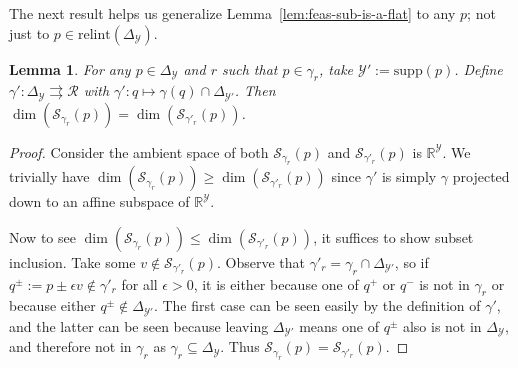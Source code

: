 \documentclass{article}
\newcommand{\Comments}{1}
\newcommand{\mytodo}[2]{\ifnum\Comments=1%
	\todo[linecolor=#1!80!black,backgroundcolor=#1,bordercolor=#1!80!black]{#2}\fi}
\newcommand{\jessiet}[1]{\mytodo{purple!20!white}{JF: #1}}
\newcommand{\reals}{\mathbb{R}}
\newcommand{\simplex}{\Delta_\Y}
\newcommand{\relint}[1]{\mathrm{relint}(#1)}
\newcommand{\supp}{\mathrm{supp}}
\newcommand{\spn}{\mathrm{span}}
\newcommand{\R}{\mathcal{R}}
\renewcommand{\S}{\mathcal{S}}
\newcommand{\Y}{\mathcal{Y}}
\newcommand{\toto}{\rightrightarrows}
\newtheorem{lemma}{Lemma}
\begin{document}
The next result helps us generalize Lemma~\ref{lem:feas-sub-is-a-flat} to any $p$; not just to $p \in \relint{\simplex}$.
\newcommand{\simplexp}{\Delta_{\Y'}}
\begin{lemma}\label{lem:p-boundary-fsd}
	For any $p \in \simplex$ and $r$ such that $p \in \gamma_r$, take $\Y' := \supp(p)$.
	Define $\gamma' : \simplex \toto \R$ with $\gamma' : q \mapsto \gamma(q) \cap \simplexp$.
	Then $\dim(\S_{\gamma_r}(p)) = \dim(\S_{\gamma'_r}(p))$.
\end{lemma}
\begin{proof}
	Consider the ambient space of both $\S_{\gamma_r}(p)$ and $\S_{\gamma'_r}(p)$ is $\reals^\Y$.
	We trivially have $\dim(\S_{\gamma_r}(p)) \geq \dim(\S_{\gamma'_r}(p))$ since $\gamma'$ is simply $\gamma$ projected down to an affine subspace of $\reals^\Y$.
	
	Now to see $\dim(\S_{\gamma_r}(p)) \leq \dim(\S_{\gamma'_r}(p))$, it suffices to show subset inclusion.
	Take some $v \not \in \S_{\gamma'_r}(p)$.
	Observe that $\gamma'_r = \gamma_r \cap \simplexp$, so if $q^\pm := p \pm \epsilon v \not \in \gamma'_r$ for all $\epsilon > 0$, it is either because one of $q^+$ or $q^-$ is not in $\gamma_r$ or because either $q^\pm \not \in \simplexp$.
	The first case can be seen easily by the definition of $\gamma'$, and the latter can be seen because leaving $\simplexp$ means one of $q^\pm$ also is not in $\simplex$, and therefore not in $\gamma_r$ as $\gamma_r \subseteq \simplex$.
	Thus $\S_{\gamma_r}(p) = \S_{\gamma'_r}(p)$.
%	
\end{proof}
\end{document}
